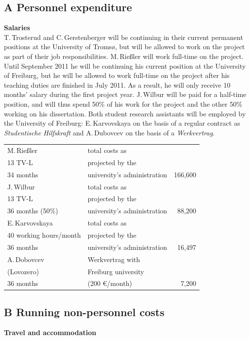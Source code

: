 \documentclass[a4paper,12pt]{article}
\begin{document}
{{\subsection*{A Personnel expenditure}
\noindent \textbf{Salaries}\\
T.\,Trosterud and C.\,Gersten\-berger will be continuing in their current permanent positions at the University of Tromsø, but will be allowed to work on the project as part of their job responsibilities. M.\,Rießler will work full-time on the project. Until September 2011 he will be continuing his current position at the University of Freiburg, but he will be allowed to work full-time on the project after his teaching duties are finished in July 2011. As a result, he will only receive 10 months' salary during the first project year. J.\,Wilbur will be paid for a half-time position, and will thus spend 50\% of his work for the project and the other 50\% working on his dissertation. Both student research assistants will be employed by the University of Freiburg: E.\,Karvovskaya on the basis of a regular contract as {\it Studentische Hilfskraft} and A.\,Dubovcev on the basis of a {\it Werkvertrag}.
\begin{longtable}{| l | l | r |}
\hline
M.\,Rießler&total costs as&\\
13 TV-L&projected by the&\\
34 months&university's administration&166,600\\
\hline
J.\,Wilbur&total costs as&\\
13 TV-L&projected by the&\\
36 months (50\%)&university's administration&88,200\\
\hline
E.\,Karvovskaya&total costs as&\\
40 working hours/month& projected by the&\\
36 months&university's administration&16,497\\
\hline
A.\,Dobovcev	&Werkvertrag with	&\\
(Lovozero)	&Freiburg university	&\\
36 months		&(200 €/month)		&7,200\\
\hline
\end{longtable}

\subsection*{B Running non-personnel costs}
\noindent \textbf{Travel and accommodation}

}}
\end{document}

